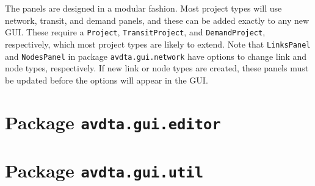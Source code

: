 The panels are designed in a modular fashion. Most project types will use network, transit, and demand panels, and these can be added exactly to any new GUI. These require a \texttt{Project}, \texttt{TransitProject}, and \texttt{DemandProject}, respectively, which most project types are likely to extend. Note that \texttt{LinksPanel} and \texttt{NodesPanel} in package \texttt{avdta.gui.network} have options to change link and node types, respectively. If new link or node types are created, these panels must be updated before the options will appear in the GUI.















\section{Package \texttt{avdta.gui.editor}}












\section{Package \texttt{avdta.gui.util}}
\label{api:util}
